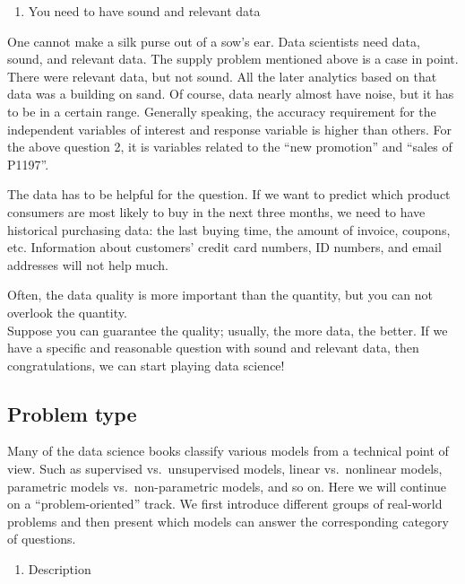 \documentclass[12pt,]{krantz}
\providecommand{\tightlist}{%
  \setlength{\itemsep}{0pt}\setlength{\parskip}{0pt}}
\begin{document}
\begin{enumerate}
\def\labelenumi{\arabic{enumi}.}
\setcounter{enumi}{1}
\tightlist
\item
  You need to have sound and relevant data
\end{enumerate}

One cannot make a silk purse out of a sow's ear. Data scientists need data, sound, and relevant data. The supply problem mentioned above is a case in point. There were relevant data, but not sound. All the later analytics based on that data was a building on sand. Of course, data nearly almost have noise, but it has to be in a certain range. Generally speaking, the accuracy requirement for the independent variables of interest and response variable is higher than others. For the above question 2, it is variables related to the ``new promotion'' and ``sales of P1197''.

The data has to be helpful for the question. If we want to predict which product consumers are most likely to buy in the next three months, we need to have historical purchasing data: the last buying time, the amount of invoice, coupons, etc. Information about customers' credit card numbers, ID numbers, and email addresses will not help much.

Often, the data quality is more important than the quantity, but you can not overlook the quantity.\\
Suppose you can guarantee the quality; usually, the more data, the better. If we have a specific and reasonable question with sound and relevant data, then congratulations, we can start playing data science!

\hypertarget{problem-type}{%
\subsection{Problem type}\label{problem-type}}

Many of the data science books classify various models from a technical point of view. Such as supervised vs.~unsupervised models, linear vs.~nonlinear models, parametric models vs.~non-parametric models, and so on. Here we will continue on a ``problem-oriented'' track. We first introduce different groups of real-world problems and then present which models can answer the corresponding category of questions.

\begin{enumerate}
\def\labelenumi{\arabic{enumi}.}
\tightlist
\item
  Description
\end{enumerate}
\end{document}
